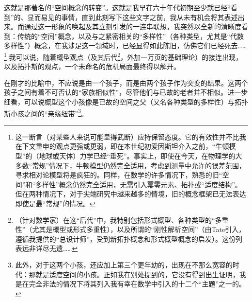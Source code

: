 这就是那著名的“空间概念的转变”。这就是我早在六十年代初期至少就已经“看到”的、显而易见的事情，直到此刻写下这些文字之前，我从未有机会将其表述出来。而通过这一形象的唤起及其立刻引发的一连串联想，我突然以全新的清晰度看到：传统的“空间”概念，以及与之紧密相关的“多样性”（各种类型，尤其是“代数多样性”）概念，在我涉足这一领域时，已经显得如此陈旧，仿佛它们已经死去……\footnote{这一断言（对某些人来说可能显得武断）应持保留态度。它的有效性并不比我在下文重申的观点更强或更弱，即在本世纪初爱因斯坦介入之前，“牛顿模型”的（地球或天体）力学已经“垂死”。事实上，即使在今天，在物理学的大多数“常规”情况下，牛顿模型仍然完全适用，考虑到测量中允许的误差范围，寻求相对论模型将是疯狂的。同样，在数学的许多情况下，熟悉的旧“空间”和“多样性”概念仍然完全适用，无需引入幂零元素、拓扑或“适度结构”。但在两种情况下，对于尖端研究中越来越多的情境，旧的概念框架已无法表达即使是最“常规”的情况。} 我可以说，随着概型观点（及其后代\footnote{（针对数学家）在这“后代”中，我特别包括形式概型、各种类型的“多重性”（尤其是概型或形式多重性），以及所谓的“刚性解析空间”（由Tate引入，遵循我提供的“总设计师”，受到新拓扑概念和形式概型概念的启发）。这份列表远非详尽无遗……}，外加一万页的基础理论）的接连出现，以及拓扑斯的观点，一个未命名的危机局面最终得以解开。

在刚才的比喻中，不应说是由一个孩子，而是由两个孩子作为突变的结果。这两个孩子之间有着不可否认的“家族相似性”，尽管他们与已故的老者并不相似。进一步细看，可以说概型这个小孩像是已故的空间之父（又名各种类型的多样性）与拓扑斯小孩之间的“亲缘纽带”\footnote{此外，对于这两个小孩，还应加上第三个更年幼的，出现在不那么宽容的时代：那就是适度空间的小孩。正如我在别处提到的，它没有得到出生证明，我是在完全非法的情况下将其列入我有幸在数学中引入的十二个“主题”之一的。}。